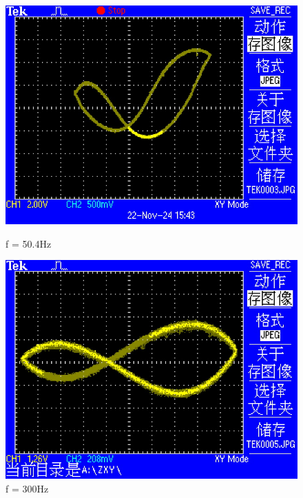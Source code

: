 \documentclass[12pt,a4paper]{article}
\begin{document}
\begin{figure}[htbp]
\begin{minipage}[b]{0.22\textwidth}
    \includegraphics[width=\textwidth]{XY/TEK0003.JPG}
    \caption{f = 50.4Hz}
\end{minipage}
\vfill
\begin{minipage}[b]{0.22\textwidth}
    \centering
    \includegraphics[width=\textwidth]{XY/TEK0005.JPG}
    \caption{f = 300Hz}
\end{minipage}
\hfill
\begin{minipage}[b]{0.22\textwidth}
    \centering

\end{minipage}
\end{figure}
\end{document}
